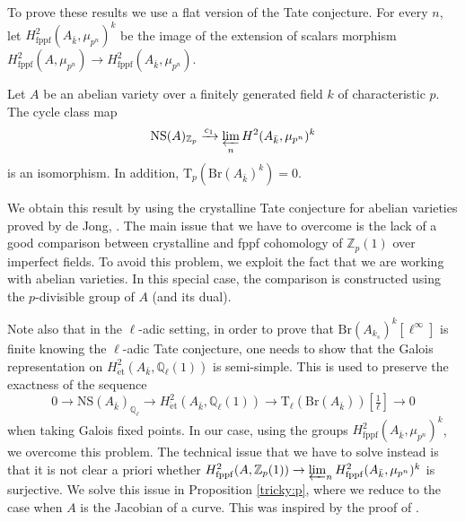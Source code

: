 \documentclass[11pt]{amsart}
\newcommand{\spa}{\medskip}
\newcommand{\Ql}{\mathbb{Q}_{\ell}}
\newcommand{\kbar}{{\bar{k}}}
\newcommand{\Zp}{{\mathbb{Z}_{p}}}
\newcommand{\et}{\mathrm{\acute{e}t}}
\newcommand{\Br}{\mathrm{Br}}
\newcommand{\NS}{\mathrm{NS}}
\newcommand{\fppf}{\mathrm{fppf}}
\newcommand{\ks}{{k_s}}
\newcommand{\mupn}{{\mu_{p^n}}}
\newcommand{\Tp}{\mathrm{T}_p}
\newcommand{\Tl}{\mathrm{T_\ell}}
\begin{document}
\spa

To prove these results we use a flat version of the Tate conjecture. For every $n$, let $H^2_\fppf(A_\kbar,\mupn)^k$ be the image of the extension of scalars morphism $H^2_\fppf(A,\mupn)\to H^2_\fppf(A_\kbar,\mupn)$.

\begin{theo}\label{i-fppf-tate:t}
	Let $A$ be an abelian variety over a finitely generated field $k$ of characteristic $p$. The cycle class map $$\NS(A)_\Zp\xrightarrow{c_1} \varprojlim_n H^2(A_\kbar,\mupn)^k$$ is an isomorphism. In addition, $\Tp(\Br(A_\kbar)^k)=0$.
\end{theo}


We obtain this result by using the crystalline Tate conjecture for abelian varieties proved by de Jong, \cite[Thm. 2.6]{deJ98}. The main issue that we have to overcome is the lack of a good comparison between crystalline and fppf cohomology of $\Zp(1)$ over imperfect fields. To avoid this problem, we exploit the fact that we are working with abelian varieties. In this special case, the comparison is constructed using the $p$-divisible group of $A$ (and its dual). 

\spa

Note also that in the $\ell$-adic setting, in order to prove that $\Br(A_\ks)^{k}[\ell^\infty]$ is finite knowing the $\ell$-adic Tate conjecture, one needs to show that the Galois representation on $H^2_\et(A_\kbar,\Ql(1))$ is semi-simple. This is used to preserve the exactness of the sequence $$0\to \NS(A_\kbar)_{\Ql}\to H^2_\et(A_\kbar,\Ql(1))\to \Tl(\mathrm{Br}(A_{\bar{k}}))[\tfrac{1}{\ell}]\to 0$$when taking Galois fixed points. In our case, using the groups $H^2_{\fppf}(A_\kbar,\mupn)^k$, we overcome this problem. The technical issue that we have to solve instead is that it is not clear a priori whether $H^2_{\fppf}(A,\Zp(1))\to \varprojlim_n H^2_{\fppf}(A_\kbar,\mupn)^k$ is surjective. We solve this issue in Proposition \ref{tricky:p}, where we reduce to the case when $A$ is the Jacobian of a curve. This was inspired by the proof of \cite[Thm. 2.1]{CS13}.
\end{document}
